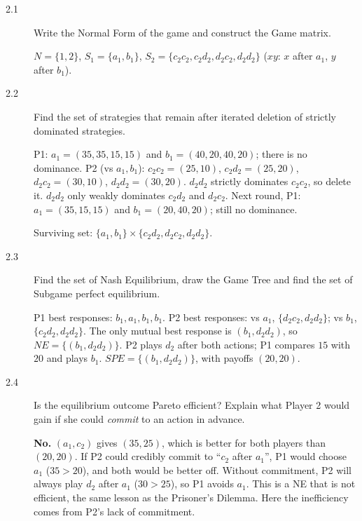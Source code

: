 \begin{description}
\item[2.1] Write the Normal Form of the game and construct the Game matrix.
\begin{solution}
$N=\{1,2\}$, $S_1=\{a_1,b_1\}$, $S_2=\{c_2c_2,c_2d_2,d_2c_2,d_2d_2\}$ ($xy$: $x$ after $a_1$, $y$ after $b_1$).
\end{solution}
\item[2.2] Find the set of strategies that remain after iterated deletion of strictly dominated strategies.
\begin{solution}
P1: $a_1=(35,35,15,15)$ and $b_1=(40,20,40,20)$; there is no dominance. P2 (vs $a_1,b_1$): $c_2c_2=(25,10)$, $c_2d_2=(25,20)$, $d_2c_2=(30,10)$, $d_2d_2=(30,20)$. $d_2d_2$ strictly dominates $c_2c_2$, so delete it. $d_2d_2$ only weakly dominates $c_2d_2$ and $d_2c_2$. Next round, P1: $a_1=(35,15,15)$ and $b_1=(20,40,20)$; still no dominance.

Surviving set: $\{a_1,b_1\}\times\{c_2d_2,d_2c_2,d_2d_2\}$.
\end{solution}
\item[2.3] Find the set of Nash Equilibrium, draw the Game Tree and find the set of Subgame perfect equilibrium.
\begin{solution}
P1 best responses: $b_1,a_1,b_1,b_1$. P2 best responses: vs $a_1$, $\{d_2c_2,d_2d_2\}$; vs $b_1$, $\{c_2d_2,d_2d_2\}$. The only mutual best response is $(b_1,d_2d_2)$, so $NE=\{(b_1,d_2d_2)\}$.
P2 plays $d_2$ after both actions; P1 compares $15$ with $20$ and plays $b_1$. $SPE=\{(b_1,d_2d_2)\}$, with payoffs $(20,20)$.
\end{solution}
\item[2.4] Is the equilibrium outcome Pareto efficient? Explain what Player 2 would gain if she could \emph{commit} to an action in advance.
\begin{solution}
\textbf{No.} $(a_1,c_2)$ gives $(35,25)$, which is better for both players than $(20,20)$. If P2 could credibly commit to ``$c_2$ after $a_1$'', P1 would choose $a_1$ ($35>20$), and both would be better off. Without commitment, P2 will always play $d_2$ after $a_1$ ($30>25$), so P1 avoids $a_1$. This is a NE that is not efficient, the same lesson as the Prisoner's Dilemma. Here the inefficiency comes from P2's lack of commitment.
\end{solution}
\end{description}

